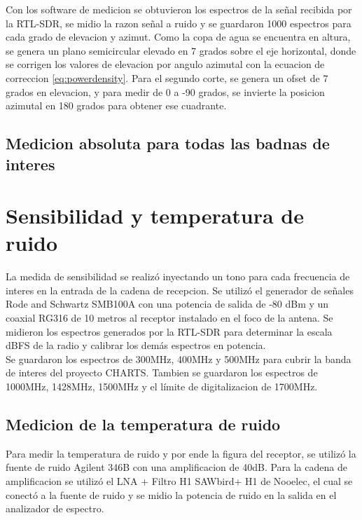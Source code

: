 Con los software de medicion se obtuvieron los espectros de la señal recibida por la RTL-SDR, se midio la razon señal a ruido y se guardaron 1000 espectros para cada grado de elevacion y azimut. Como la copa de agua se encuentra en altura, se genera un plano semicircular elevado en 7 grados sobre el eje horizontal, donde se corrigen los valores de elevacion por angulo azimutal con la ecuacion de correccion \ref{eq:powerdensity}. Para el segundo corte, se genera un ofset de 7 grados en elevacion, y para medir de 0 a -90 grados, se invierte la posicion azimutal en 180 grados para obtener ese cuadrante.\\

\subsection{Medicion absoluta para todas las badnas de interes}

\section{Sensibilidad y temperatura de ruido}

La medida de sensibilidad se realizó inyectando un tono para cada frecuencia de interes en la entrada de la cadena de recepcion. Se utilizó el generador de señales Rode and Schwartz SMB100A con una potencia de salida de -80 dBm y un coaxial RG316 de 10 metros al receptor instalado en el foco de la antena. Se midieron los espectros generados por la RTL-SDR para determinar la escala dBFS de la radio y calibrar los demás espectros en potencia.\\

Se guardaron los espectros de 300MHz, 400MHz y 500MHz para cubrir la banda de interes del proyecto CHARTS. Tambien se guardaron los espectros de 1000MHz, 1428MHz, 1500MHz y el límite de digitalizacion de 1700MHz.\\

\subsection{Medicion de la temperatura de ruido}

Para medir la temperatura de ruido y por ende la figura del receptor, se utilizó la fuente de ruido Agilent 346B con una amplificacion de 40dB. Para la cadena de amplificacion se utilizó el LNA + Filtro H1 SAWbird+ H1 de Nooelec, el cual se conectó a la fuente de ruido y se midio la potencia de ruido en la salida en el analizador de espectro.\\

